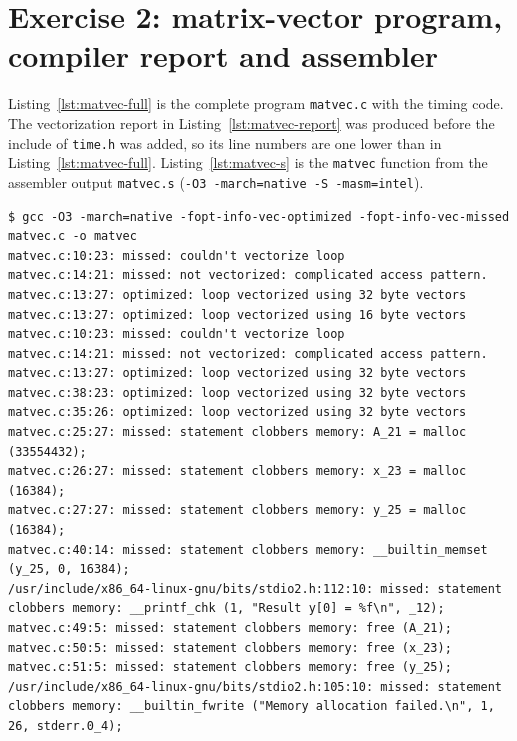 \documentclass[a4paper,11pt]{article}
\begin{document}


\section{Exercise 2: matrix-vector program, compiler report and assembler}
\label{app:matvec}

Listing~\ref{lst:matvec-full} is the complete program \texttt{matvec.c}
with the timing code. The vectorization report in
Listing~\ref{lst:matvec-report} was produced before the include of
\texttt{time.h} was added, so its line numbers are one lower than in
Listing~\ref{lst:matvec-full}. Listing~\ref{lst:matvec-s} is the
\texttt{matvec} function from the assembler output \texttt{matvec.s}
(\texttt{-O3 -march=native -S -masm=intel}).



\begin{lstlisting}[language={}, caption={Full GCC vectorization report (\texttt{-O3 -march=native}).}, label={lst:matvec-report}]
$ gcc -O3 -march=native -fopt-info-vec-optimized -fopt-info-vec-missed matvec.c -o matvec
matvec.c:10:23: missed: couldn't vectorize loop
matvec.c:14:21: missed: not vectorized: complicated access pattern.
matvec.c:13:27: optimized: loop vectorized using 32 byte vectors
matvec.c:13:27: optimized: loop vectorized using 16 byte vectors
matvec.c:10:23: missed: couldn't vectorize loop
matvec.c:14:21: missed: not vectorized: complicated access pattern.
matvec.c:13:27: optimized: loop vectorized using 32 byte vectors
matvec.c:38:23: optimized: loop vectorized using 32 byte vectors
matvec.c:35:26: optimized: loop vectorized using 32 byte vectors
matvec.c:25:27: missed: statement clobbers memory: A_21 = malloc (33554432);
matvec.c:26:27: missed: statement clobbers memory: x_23 = malloc (16384);
matvec.c:27:27: missed: statement clobbers memory: y_25 = malloc (16384);
matvec.c:40:14: missed: statement clobbers memory: __builtin_memset (y_25, 0, 16384);
/usr/include/x86_64-linux-gnu/bits/stdio2.h:112:10: missed: statement clobbers memory: __printf_chk (1, "Result y[0] = %f\n", _12);
matvec.c:49:5: missed: statement clobbers memory: free (A_21);
matvec.c:50:5: missed: statement clobbers memory: free (x_23);
matvec.c:51:5: missed: statement clobbers memory: free (y_25);
/usr/include/x86_64-linux-gnu/bits/stdio2.h:105:10: missed: statement clobbers memory: __builtin_fwrite ("Memory allocation failed.\n", 1, 26, stderr.0_4);
\end{lstlisting}


\end{document}
